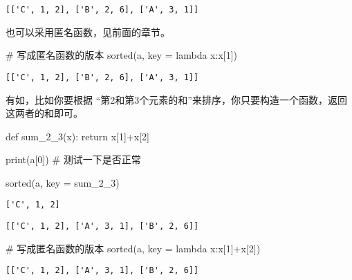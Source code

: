 \documentclass[
  letterpaper,
  DIV=11,
  numbers=noendperiod]{scrreprt}
\newenvironment{Shaded}{\begin{snugshade}}{\end{snugshade}}
\newcommand{\BuiltInTok}[1]{\textcolor[rgb]{0.00,0.23,0.31}{#1}}
\newcommand{\CommentTok}[1]{\textcolor[rgb]{0.37,0.37,0.37}{#1}}
\newcommand{\ControlFlowTok}[1]{\textcolor[rgb]{0.00,0.23,0.31}{#1}}
\newcommand{\DecValTok}[1]{\textcolor[rgb]{0.68,0.00,0.00}{#1}}
\newcommand{\KeywordTok}[1]{\textcolor[rgb]{0.00,0.23,0.31}{#1}}
\newcommand{\NormalTok}[1]{\textcolor[rgb]{0.00,0.23,0.31}{#1}}
\newcommand{\OperatorTok}[1]{\textcolor[rgb]{0.37,0.37,0.37}{#1}}
\begin{document}
\begin{verbatim}
[['C', 1, 2], ['B', 2, 6], ['A', 3, 1]]
\end{verbatim}

也可以采用匿名函数，见前面的章节。

\begin{Shaded}
\begin{Highlighting}[]
\CommentTok{\# 写成匿名函数的版本}
\BuiltInTok{sorted}\NormalTok{(a, key }\OperatorTok{=} \KeywordTok{lambda}\NormalTok{ x:x[}\DecValTok{1}\NormalTok{]) }
\end{Highlighting}
\end{Shaded}

\begin{verbatim}
[['C', 1, 2], ['B', 2, 6], ['A', 3, 1]]
\end{verbatim}

有如，比如你要根据
``第2和第3个元素的和''来排序，你只要构造一个函数，返回这两者的和即可。

\begin{Shaded}
\begin{Highlighting}[]
\KeywordTok{def}\NormalTok{ sum\_2\_3(x):}
    \ControlFlowTok{return}\NormalTok{ x[}\DecValTok{1}\NormalTok{]}\OperatorTok{+}\NormalTok{x[}\DecValTok{2}\NormalTok{]}

\BuiltInTok{print}\NormalTok{(a[}\DecValTok{0}\NormalTok{]) }\CommentTok{\# 测试一下是否正常}

\BuiltInTok{sorted}\NormalTok{(a, key }\OperatorTok{=}\NormalTok{ sum\_2\_3)}
\end{Highlighting}
\end{Shaded}

\begin{verbatim}
['C', 1, 2]
\end{verbatim}

\begin{verbatim}
[['C', 1, 2], ['A', 3, 1], ['B', 2, 6]]
\end{verbatim}

\begin{Shaded}
\begin{Highlighting}[]
\CommentTok{\# 写成匿名函数的版本}
\BuiltInTok{sorted}\NormalTok{(a, key }\OperatorTok{=} \KeywordTok{lambda}\NormalTok{ x:x[}\DecValTok{1}\NormalTok{]}\OperatorTok{+}\NormalTok{x[}\DecValTok{2}\NormalTok{])}
\end{Highlighting}
\end{Shaded}

\begin{verbatim}
[['C', 1, 2], ['A', 3, 1], ['B', 2, 6]]
\end{verbatim}
\end{document}
